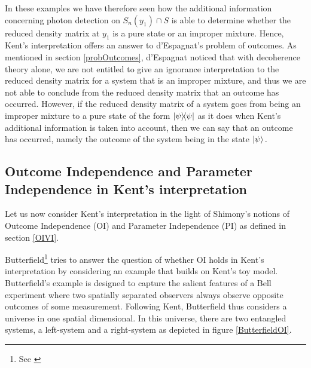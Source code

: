 In these examples we have therefore seen how the additional information concerning photon detection on $S_n(y_1)\cap S$ is able to determine whether the reduced density matrix at $y_1$ is a pure state or an improper mixture. Hence, Kent's interpretation offers an answer to d'Espagnat's problem of outcomes. As mentioned in section \ref{probOutcomes}, d'Espagnat noticed that with decoherence theory alone, we are not entitled to give an ignorance interpretation to the reduced density matrix for a system that is an improper mixture, and thus we are not able to conclude from the reduced density matrix that an outcome has occurred. However, if the reduced density matrix of a system goes from being an improper mixture to a pure state of the form $\dyad{\psi}$ as it does when Kent's additional information is taken into account, then we can say that an outcome has occurred, namely the outcome of the system being in the state $\ket{\psi}.$  




\subsection{Outcome Independence and Parameter Independence in Kent's interpretation}
Let us now consider Kent's interpretation in the light of Shimony's notions of Outcome Independence (OI) and Parameter Independence (PI) as defined in section \ref{OIVI}. 

Butterfield\footnote{See \cite[30-32]{Butterfield}} tries to answer the question of whether OI holds in Kent's interpretation by considering an example that builds on Kent's toy model. Butterfield's example is designed to capture the salient features of a Bell experiment where two spatially separated observers always observe opposite outcomes of some measurement. Following Kent, Butterfield thus considers a universe in one spatial dimensional. In this universe, there are two entangled systems, a left-system and a right-system as depicted in figure \ref{ButterfieldOI}.

